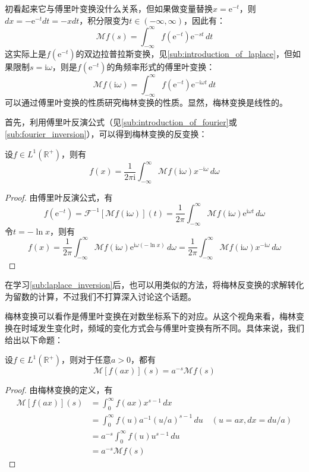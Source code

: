 \documentclass{ctexbook}
\begin{document}
初看起来它与傅里叶变换没什么关系，但如果做变量替换$x=\mathrm{e}^{-t}$，则$dx=-\mathrm{e}^{-t}dt=-x dt$，积分限变为$t\in(-\infty,\infty)$，因此有：
\[\mathcal{M} f(s)=\int_{-\infty}^{\infty}f(\mathrm{e}^{-t})\mathrm{e}^{-s t}\,dt\]
这实际上是$f(\mathrm{e}^{-t})$的双边拉普拉斯变换，见\ref{sub:introduction_of_laplace}，但如果限制$s=\mathrm{i}\omega$，则是$f(\mathrm{e}^{-t})$的角频率形式的傅里叶变换：
\[\mathcal{M} f(\mathrm{i}\omega)=\int_{-\infty}^{\infty}f(\mathrm{e}^{-t})\mathrm{e}^{-\mathrm{i}\omega t}\,dt\]
可以通过傅里叶变换的性质研究梅林变换的性质。显然，梅林变换是线性的。

首先，利用傅里叶反演公式（见\ref{sub:introduction_of_fourier}或\ref{sub:fourier_inversion}），可以得到梅林变换的反变换：
\begin{proposition}[梅林反变换]
    设$f\in L^1(\mathbb{R}^+)$，则有
    \[f(x)=\frac{1}{2\pi \mathrm{i}}\int_{-\infty}^{\infty}\mathcal{M} f(\mathrm{i}\omega)x^{-\mathrm{i}\omega}\,d\omega\]
\end{proposition}
\begin{proof}
    由傅里叶反演公式，有
    \[f(\mathrm{e}^{-t})=\mathcal{F} ^{-1}[\mathcal{M} f(\mathrm{i}\omega)](t)=\frac{1}{2\pi}\int_{-\infty}^{\infty}\mathcal{M} f(\mathrm{i}\omega)\mathrm{e}^{\mathrm{i}\omega t}\,d\omega\]
    令$t=-\ln x$，则有
    \[f(x)=\frac{1}{2\pi}\int_{-\infty}^{\infty}\mathcal{M} f(\mathrm{i}\omega)\mathrm{e}^{\mathrm{i}\omega (-\ln x)}\,d\omega=\frac{1}{2\pi}\int_{-\infty}^{\infty}\mathcal{M} f(\mathrm{i}\omega)x^{-\mathrm{i}\omega}\,d\omega\]
\end{proof}

在学习\ref{sub:laplace_inversion}后，也可以用类似的方法，将梅林反变换的求解转化为留数的计算，不过我们不打算深入讨论这个话题。

梅林变换可以看作是傅里叶变换在对数坐标系下的对应。从这个视角来看，梅林变换在时域发生变化时，频域的变化方式会与傅里叶变换有所不同。具体来说，我们给出以下命题：
\begin{proposition}[梅林变换的尺度变换性质]
    设$f\in L^1(\mathbb{R}^+)$，则对于任意$a>0$，都有
    \[\mathcal{M} [f(ax)](s)=a^{-s}\mathcal{M} f(s)\]
\end{proposition}
\begin{proof}
    由梅林变换的定义，有
    \begin{align*}
        \mathcal{M} [f(ax)](s)&=\int_0^{\infty}f(ax)x^{s-1}\,dx\\
        &=\int_0^{\infty}f(u)a^{-1}(u/a)^{s-1}\,du\quad (u=ax,dx=du/a)\\
        &=a^{-s}\int_0^{\infty}f(u)u^{s-1}\,du\\
        &=a^{-s}\mathcal{M} f(s)
    \end{align*}
\end{proof}
\end{document}
